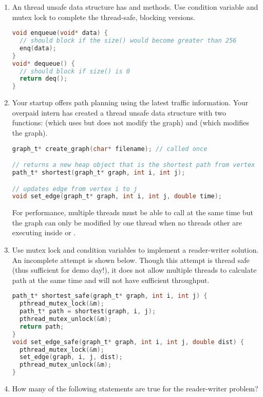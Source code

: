 \begin{enumerate}
\item An thread unsafe data structure has   and  methods. Use condition variable and mutex lock to complete the thread-safe, blocking versions.

\begin{lstlisting}[language=C]
void enqueue(void* data) {
  // should block if the size() would become greater than 256
  enq(data);
}
void* dequeue() {
  // should block if size() is 0
  return deq();
}
\end{lstlisting}

\item Your startup offers path planning using the latest traffic information. Your overpaid intern has created a thread unsafe data structure with two functions:  (which uses but does not modify the graph) and  (which modifies the graph).

\begin{lstlisting}[language=C]
graph_t* create_graph(char* filename); // called once

// returns a new heap object that is the shortest path from vertex i to j
path_t* shortest(graph_t* graph, int i, int j);

// updates edge from vertex i to j
void set_edge(graph_t* graph, int i, int j, double time);

\end{lstlisting}

For performance, multiple threads must be able to call  at the same time but the graph can only be modified by one thread when no threads other are executing inside  or .

\item Use mutex lock and condition variables to implement a reader-writer solution. An incomplete attempt is shown below. Though this attempt is thread safe (thus sufficient for demo day!), it does not allow multiple threads to calculate  path at the same time and will not have sufficient throughput.

\begin{lstlisting}[language=C]
path_t* shortest_safe(graph_t* graph, int i, int j) {
  pthread_mutex_lock(&m);
  path_t* path = shortest(graph, i, j);
  pthread_mutex_unlock(&m);
  return path;
}
void set_edge_safe(graph_t* graph, int i, int j, double dist) {
  pthread_mutex_lock(&m);
  set_edge(graph, i, j, dist);
  pthread_mutex_unlock(&m);
}
\end{lstlisting}
\item How many of the following statements are true for the reader-writer problem?


\end{enumerate}
